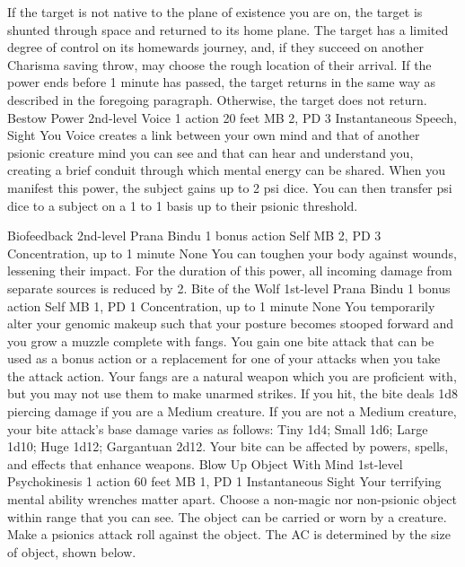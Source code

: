 If the target is not native to the plane of existence you are on,
the target is shunted through space and returned to its home plane.
The target has a limited degree of control on its homewards journey,
and, if they succeed on another Charisma saving throw,
may choose the rough location of their arrival.
If the power ends before 1 minute has passed,
the target returns in the same way as described in the foregoing paragraph.
Otherwise,
the target does not return.
\DndPowerHeader%
    {Bestow Power\label{pwr:bestow-power}}
    {2nd-level Voice}
    {1 action}
    {20 feet}
    {MB 2, PD 3}
    {Instantaneous}
    {Speech, Sight}
You Voice creates a link between your own
mind and that of another psionic creature mind you can see
and that can hear and understand you,
creating a brief conduit through which mental energy can be
shared. When you manifest this power, the subject gains up
to 2 psi dice. You can then transfer psi dice to a subject
on a 1 to 1 basis up to their psionic threshold.

\DndPowerHeader%
    {Biofeedback\label{pwr:biofeedback}}
    {2nd-level Prana Bindu}
    {1 bonus action}
    {Self}
    {MB 2, PD 3}
    {Concentration, up to 1 minute}
    {None}
You can toughen your body against wounds,
lessening their impact. For the duration of this power,
all incoming damage from separate sources is reduced by 2.
\DndPowerHeader%
    {Bite of the Wolf\label{pwr:bite-of-the-wolf}}
    {1st-level Prana Bindu}
    {1 bonus action}
    {Self}
    {MB 1, PD 1}
    {Concentration, up to 1 minute}
    {None}
You temporarily alter your genomic makeup
such that your posture becomes stooped forward
and you grow a muzzle complete with fangs.
You gain one bite attack that can be used as a bonus action
or a replacement for one of your attacks when you take the attack action.
Your fangs are a natural weapon which you are proficient with,
but you may not use them to make unarmed strikes. 
If you hit, the bite deals 1d8 piercing damage if you are a Medium creature.
If you are not a Medium creature, your bite attack's base damage varies as follows:
Tiny 1d4; Small 1d6; Large 1d10; Huge 1d12; Gargantuan 2d12.    
Your bite can be affected by powers, spells, and effects that enhance weapons.
\DndPowerHeader%
    {Blow Up Object With Mind\label{pwr:blow-up-object-with-mind}}
    {1st-level Psychokinesis}
    {1 action}
    {60 feet}
    {MB 1, PD 1}
    {Instantaneous}
    {Sight}
Your terrifying mental ability wrenches matter apart.
Choose a non-magic nor non-psionic object within range that you can see.
The object can be carried or worn by a creature.
Make a psionics attack roll against the object.
The AC is determined by the size of object, shown below.

